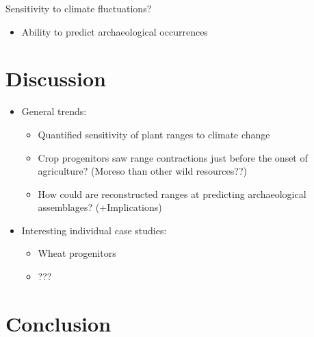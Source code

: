 \documentclass[
  authoryear,
  review]{elsarticle}
\providecommand{\tightlist}{%
  \setlength{\itemsep}{0pt}\setlength{\parskip}{0pt}}\usepackage{longtable,booktabs,array}
\begin{document}
Sensitivity to climate fluctuations?

\begin{itemize}
\tightlist
\item
  Ability to predict archaeological occurrences
\end{itemize}

\section{Discussion}\label{discussion}

\begin{itemize}
\tightlist
\item
  General trends:

  \begin{itemize}
  \tightlist
  \item
    Quantified sensitivity of plant ranges to climate change
  \item
    Crop progenitors saw range contractions just before the onset of
    agriculture? (Moreso than other wild resources??)
  \item
    How could are reconstructed ranges at predicting archaeological
    assemblages? (+Implications)
  \end{itemize}
\item
  Interesting individual case studies:

  \begin{itemize}
  \tightlist
  \item
    Wheat progenitors
  \item
    ???
  \end{itemize}
\end{itemize}

\section{Conclusion}\label{conclusion}


\renewcommand\refname{References}
  
\end{document}
